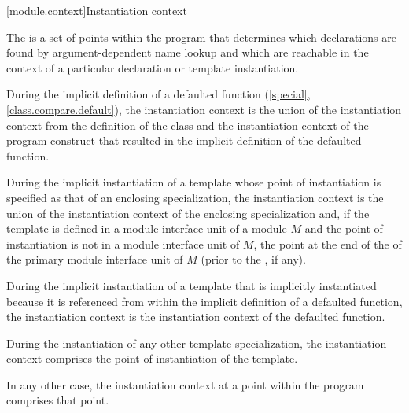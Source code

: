 [module.context]{Instantiation context}

\pnum
The  is a set of points within the program
that determines which declarations are found by
argument-dependent name lookup
and which are reachable
in the context of a particular declaration or template instantiation.

\pnum
During the implicit definition of
a defaulted function (\ref{special}, \ref{class.compare.default}),
the instantiation context is the union of
the instantiation context from the definition of the class and
the instantiation context of the program construct that
resulted in the implicit definition of the defaulted function.

\pnum
During the implicit instantiation of a template
whose point of instantiation is specified as
that of an enclosing specialization,
the instantiation context is the union of
the instantiation context of the enclosing specialization and,
if the template is defined in a module interface unit of a module $M$
and the point of instantiation is not in a module interface unit of $M$,
the point at the end of the
 of the
primary module interface unit of $M$
(prior to the , if any).

\pnum
During the implicit instantiation of a template
that is implicitly instantiated because it is referenced
from within the implicit definition of a defaulted function,
the instantiation context is the instantiation context of
the defaulted function.

\pnum
During the instantiation of any other template specialization,
the instantiation context comprises the point of instantiation
of the template.

\pnum
In any other case, the instantiation context
at a point within the program
comprises that point.

